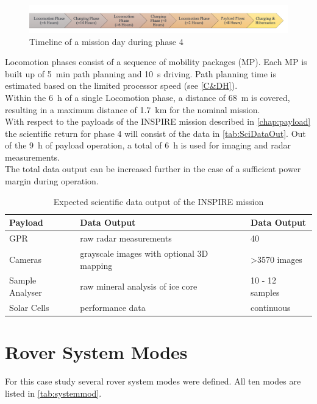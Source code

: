 \begin{figure}[htb]
  \includegraphics[width=1.0\textwidth]{Media/Timeline_day.png}
  \caption{Timeline of a mission day during phase 4}
  \label{fig:timeline-day}
\end{figure}


Locomotion phases consist of a sequence of mobility packages (MP). Each MP is built up of 5~min path planning and 10~s driving. Path planning time is estimated based on the limited processor speed (see \autoref{C&DH}). \\
Within the 6~h of a single Locomotion phase, a distance of 68~m is covered, resulting in a maximum distance of 1.7~km for the nominal mission.  \\

With respect to the payloads of the INSPIRE mission described in \autoref{chap:payload} the scientific return for phase 4 will consist of the data in \autoref{tab:SciDataOut}. Out of the 9~h of payload operation, a total of 6~h is used for imaging and radar measurements. \\
The total data output can be increased further in the case of a sufficient power margin during operation.

\begin{table}[h]
\centering
\caption{Expected scientific data output of the INSPIRE mission }
\begin{tabular}{lll}
\toprule
Payload         & Data Output                               & Data Output     \\ 
\midrule
GPR             & raw radar measurements                    & 40              \\
Cameras         & grayscale images with optional 3D mapping & >3570 images     \\
Sample Analyser & raw mineral analysis of ice core          & 10 - 12 samples \\
Solar Cells     & performance data                          & continuous      \\ 
\bottomrule
\end{tabular}
\label{tab:SciDataOut}
\end{table}

  
\section{Rover System Modes}
\label{chap:rovsubmod}
For this case study several rover system modes were defined. All ten modes are listed in \autoref{tab:systemmod}. 

